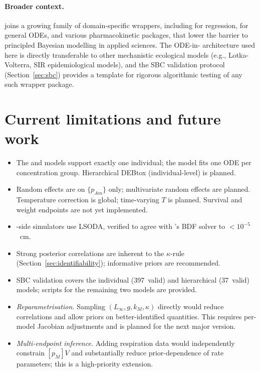 \documentclass[article,shortnames]{jss}
\newcommand{\pAm}{\{p_{Am}\}}
\newcommand{\pM}{[p_M]}
\begin{document}
\paragraph{Broader context.}
 joins a growing family of domain-specific
 wrappers, including 
\citep{Burknerbrms2017} for regression, 
\citep{deBInfer2017} for general ODEs, and various pharmacokinetic
packages, that lower the barrier to principled Bayesian modelling
in applied sciences.  The ODE-in- architecture used here is
directly transferable to other mechanistic ecological models
(e.g., Lotka-Volterra, SIR epidemiological models), and the SBC
validation protocol (Section~\ref{sec:sbc}) provides a template for
rigorous algorithmic testing of any such wrapper package.


\section{Current limitations and future work} \label{sec:limitations}

\begin{itemize}
  \item The  and  models
    support exactly one individual; the  model fits
    one ODE per concentration group.  Hierarchical DEBtox (individual-level)
    is planned.
  \item Random effects are on $\pAm$ only; multivariate random effects
    are planned.  Temperature correction is global; time-varying $T$
    is planned.  Survival and weight endpoints are not yet implemented.
  \item {}-side simulators use  LSODA, verified to
    agree with 's BDF solver to $< 10^{-5}$~cm.
  \item Strong posterior correlations are inherent to the
    $\kappa$-rule (Section~\ref{sec:identifiability}); informative
    priors are recommended.
  \item SBC validation covers the individual (397~valid) and
    hierarchical (37~valid) models; scripts for the remaining two
    models are provided.
  \item \emph{Reparametrisation.}  Sampling $(L_\infty, g, k_M,
    \kappa)$ directly would reduce correlations and allow priors on
    better-identified quantities.  This requires per-model Jacobian
    adjustments and is planned for the next major version.
  \item \emph{Multi-endpoint inference.}  Adding respiration data
    would independently constrain $\pM V$ and substantially reduce
    prior-dependence of rate parameters; this is a high-priority
    extension.
\end{itemize}
\end{document}
